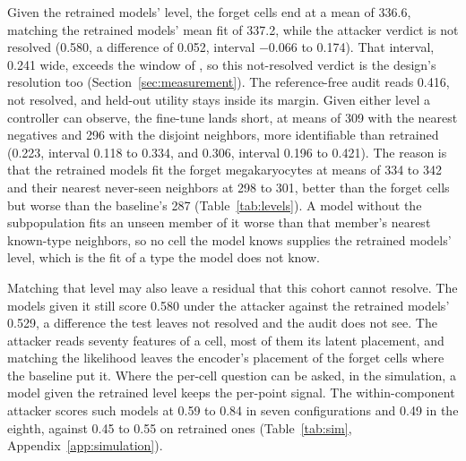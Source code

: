 \documentclass{article}
\begin{document}
Given the retrained models' level, the forget cells end at a mean of 336.6, matching the retrained models' mean fit of 337.2, while the attacker verdict is not resolved (0.580, a difference of 0.052, interval $-0.066$ to 0.174). That interval, 0.241 wide, exceeds the window of , so this not-resolved verdict is the design's resolution too (Section~\ref{sec:measurement}). The reference-free audit reads 0.416, not resolved, and held-out utility stays inside its margin. Given either level a controller can observe, the fine-tune lands short, at means of 309 with the nearest negatives and 296 with the disjoint neighbors, more identifiable than retrained (0.223, interval 0.118 to 0.334, and 0.306, interval 0.196 to 0.421). The reason is that the retrained models fit the forget megakaryocytes at means of 334 to 342 and their nearest never-seen neighbors at 298 to 301, better than the forget cells but worse than the baseline's 287 (Table~\ref{tab:levels}). A model without the subpopulation fits an unseen member of it worse than that member's nearest known-type neighbors, so no cell the model knows supplies the retrained models' level, which is the fit of a type the model does not know.

Matching that level may also leave a residual that this cohort cannot resolve. The models given it still score 0.580 under the attacker against the retrained models' 0.529, a difference the test leaves not resolved and the audit does not see. The attacker reads seventy features of a cell, most of them its latent placement, and matching the likelihood leaves the encoder's placement of the forget cells where the baseline put it. Where the per-cell question can be asked, in the simulation, a model given the retrained level keeps the per-point signal. The within-component attacker scores such models at 0.59 to 0.84 in seven configurations and 0.49 in the eighth, against 0.45 to 0.55 on retrained ones (Table~\ref{tab:sim}, Appendix~\ref{app:simulation}).

\begin{table}[t]
\centering
\caption{Likelihood-targeted unlearning on PBMC-33k cluster 13 with three targets, ten seeds each, alongside the baseline and the retrained models. The forget fit is the mean negative ELBO over the forget cells. The AUC, advantage and paired difference come from the canonical attacker of Table~\ref{tab:main}, with the attacker's verdict beside them; the audit is the reference-free audit against the mean of the five clean retrains, with its interval and paired verdict (Appendix~\ref{app:reffree}). The second target is the mean over the 194 matched negatives, which coincides with the retrained models' level; the third is 88 held-out neighbors the evaluation never uses. Held-out ELBO and marker $r$ come from \texttt{utility\_intervals.json}, the source of Table~\ref{tab:main}. Generated from \texttt{targeted\_unlearning.json}, \texttt{paired\_diff\_33k.json}, \texttt{audit\_reference\_free.json}, \texttt{utility\_intervals.json}, and \texttt{calibration\_levels.json}.}
\label{tab:ltu}
\small
\resizebox{\textwidth}{!}{}
\end{table}
\end{document}
